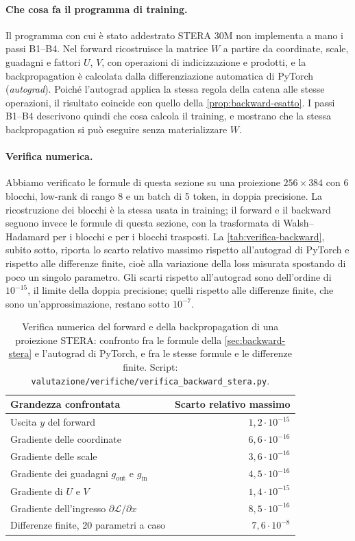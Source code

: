 \paragraph{Che cosa fa il programma di training.} Il programma con cui è stato addestrato STERA 30M non implementa a mano i passi B1--B4. Nel forward ricostruisce la matrice $W$ a partire da coordinate, scale, guadagni e fattori $U$, $V$, con operazioni di indicizzazione e prodotti, e la backpropagation è calcolata dalla differenziazione automatica di PyTorch (\emph{autograd}). Poiché l'autograd applica la stessa regola della catena alle stesse operazioni, il risultato coincide con quello della \autoref{prop:backward-esatto}. I passi B1--B4 descrivono quindi che cosa calcola il training, e mostrano che la stessa backpropagation si può eseguire senza materializzare $W$.

\paragraph{Verifica numerica.} Abbiamo verificato le formule di questa sezione su una proiezione $256\times384$ con 6 blocchi, low-rank di rango 8 e un batch di 5 token, in doppia precisione. La ricostruzione dei blocchi è la stessa usata in training; il forward e il backward seguono invece le formule di questa sezione, con la trasformata di Walsh--Hadamard per i blocchi e per i blocchi trasposti. La \autoref{tab:verifica-backward}, subito sotto, riporta lo scarto relativo massimo rispetto all'autograd di PyTorch e rispetto alle differenze finite, cioè alla variazione della loss misurata spostando di poco un singolo parametro. Gli scarti rispetto all'autograd sono dell'ordine di $10^{-15}$, il limite della doppia precisione; quelli rispetto alle differenze finite, che sono un'approssimazione, restano sotto $10^{-7}$.

\begin{table}[H]
\centering
\small
\begin{tabular}{lr}
\toprule
Grandezza confrontata & Scarto relativo massimo \\
\midrule
Uscita $y$ del forward & $1{,}2\cdot10^{-15}$ \\
Gradiente delle coordinate & $6{,}6\cdot10^{-16}$ \\
Gradiente delle scale & $3{,}6\cdot10^{-16}$ \\
Gradiente dei guadagni $g_{\mathrm{out}}$ e $g_{\mathrm{in}}$ & $4{,}5\cdot10^{-16}$ \\
Gradiente di $U$ e $V$ & $1{,}4\cdot10^{-15}$ \\
Gradiente dell'ingresso $\partial\mathcal L/\partial x$ & $8{,}5\cdot10^{-16}$ \\
\midrule
Differenze finite, 20 parametri a caso & $7{,}6\cdot10^{-8}$ \\
\bottomrule
\end{tabular}
\caption{Verifica numerica del forward e della backpropagation di una proiezione STERA: confronto fra le formule della \autoref{sec:backward-stera} e l'autograd di PyTorch, e fra le stesse formule e le differenze finite. Script: \texttt{valutazione/verifiche/verifica\_backward\_stera.py}.}
\label{tab:verifica-backward}
\end{table}


